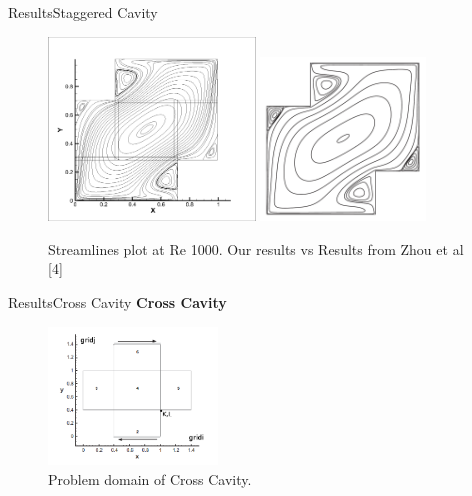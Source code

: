 \documentclass[11pt]{beamer}
\begin{document}
\begin{frame}{Results}{Staggered Cavity}
\begin{figure}[Hh]
\includegraphics[width=0.49\textwidth]{images/stagerred/re1000psi}\hspace{1cm}
\includegraphics[width=0.39\textwidth]{images/stagerred/re1000psiN}
\caption{Streamlines plot at Re 1000. Our results vs Results from Zhou et al [4]}
\end{figure}
\end{frame}

\begin{frame}{Results}{Cross Cavity}
\textbf{Cross Cavity}\linebreak
\begin{figure}[H]
\centerline{\includegraphics[width=0.4\textwidth]{images/jesus/domain}}
\caption{Problem domain of Cross Cavity.}
\end{figure}
\end{frame}
\end{document}
